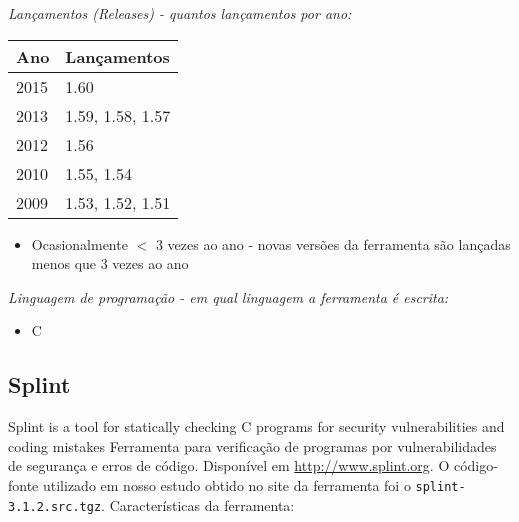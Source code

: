 \begin{description}

  \item {\it Lançamentos ({\it Releases}) - quantos lançamentos por ano:}
    \begin{table}[h!]
      \centering
      \begin{tabular}{| l | l |}
        \hline
        Ano  & Lançamentos      \\
        \hline
        2015 & 1.60             \\
        2013 & 1.59, 1.58, 1.57 \\
        2012 & 1.56             \\
        2010 & 1.55, 1.54       \\
        2009 & 1.53, 1.52, 1.51 \\
        \hline
      \end{tabular}
    \end{table}
    \begin{itemize}
      \item Ocasionalmente $<$ 3 vezes ao ano - novas versões da ferramenta são lançadas menos que 3 vezes ao ano
    \end{itemize}

  \item {\it Linguagem de programação - em qual linguagem a ferramenta é escrita:}
    \begin{itemize}
      \item C
    \end{itemize}

\end{description}

\subsection{Splint}

Splint is a tool for statically checking C programs for security
vulnerabilities and coding mistakes Ferramenta para verificação de programas
por vulnerabilidades de segurança e erros de código. Disponível em
\url{http://www.splint.org}. O código-fonte utilizado em nosso estudo obtido
no site da ferramenta foi o \texttt{splint-3.1.2.src.tgz}. Características da
ferramenta:

